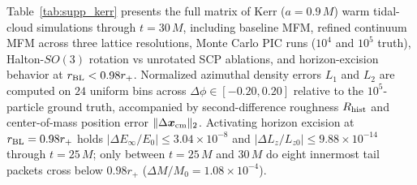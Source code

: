 \documentclass[twocolumn,prx,aps,superscriptaddress,nofootinbib,floatfix]{revtex4-2}
\begin{document}
Table~\ref{tab:supp_kerr} presents the full matrix of Kerr ($a = 0.9\,M$) warm tidal-cloud simulations through $t = 30\,M$, including baseline MFM, refined continuum MFM across three lattice resolutions, Monte Carlo PIC runs ($10^4$ and $10^5$ truth), Halton-$SO(3)$ rotation vs unrotated SCP ablations, and horizon-excision behavior at $r_{\rm BL} < 0.98 r_+$. Normalized azimuthal density errors $L_1$ and $L_2$ are computed on $24$ uniform bins across $\Delta\phi \in [-0.20, 0.20]$ relative to the $10^5$-particle ground truth, accompanied by second-difference roughness $R_{\rm hist}$ and center-of-mass position error $\|\Delta \bm{x}_{\rm cm}\|_2$. Activating horizon excision at $r_{\rm BL} = 0.98 r_+$ holds $|\Delta E_\infty / E_0| \le 3.04 \times 10^{-8}$ and $|\Delta L_z / L_{z0}| \le 9.88 \times 10^{-14}$ through $t = 25\,M$; only between $t = 25\,M$ and $30\,M$ do eight innermost tail packets cross below $0.98 r_+$ ($\Delta M / M_0 = 1.08 \times 10^{-4}$).
\end{document}
